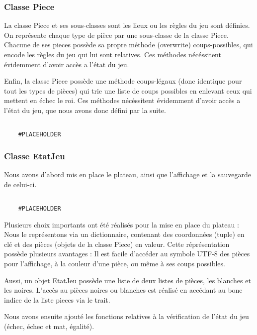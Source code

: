 \documentclass{article}
\begin{document}
\subsubsection{Classe Piece}
La classe Piece et ses sous-classes sont les lieux ou les règles du jeu sont définies.
On représente chaque type de pièce par une sous-classe de la classe Piece.
Chacune de ses pieces possède sa propre méthode (overwrite) coups-possibles, qui encode les règles du jeu
qui lui sont relatives. Ces méthodes nécéssitent évidemment d'avoir accès a l'état du jeu.

Enfin, la classe Piece possède une méthode coups-légaux (donc identique pour tout les types de pièces)
qui trie une liste de coups possibles en enlevant ceux qui mettent en échec le roi.
Ces méthodes nécéssitent évidemment d'avoir accès a l'état du jeu, que nous avons donc défini par la suite.

\begin{verbatim}

    #PLACEHOLDER
\end{verbatim}

\subsubsection{Classe EtatJeu}
Nous avons d'abord mis en place le plateau, ainsi que l'affichage et la sauvegarde de celui-ci.

\begin{verbatim}

    #PLACEHOLDER
\end{verbatim}

Plusieurs choix importants ont été réalisés pour la mise en place du plateau :
Nous le représentons via un dictionnaire, contenant des coordonnées (tuple) en clé
et des pièces (objets de la classe Piece) en valeur. Cette réprésentation
possède plusieurs avantages : Il est facile d'accéder au symbole UTF-8 des pièces
pour l'affichage, à la couleur d'une pièce, ou même à ses coups possibles.

Aussi, un objet EtatJeu possède une liste de deux listes de pièces, les blanches et les noires.
L'accès au pièces noires ou blanches est réalisé en accédant au bone indice de la liste pieces via
le trait.


Nous avons ensuite ajouté les fonctions relatives à la vérification de l'état du jeu
(échec, échec et mat, égalité).
\end{document}
